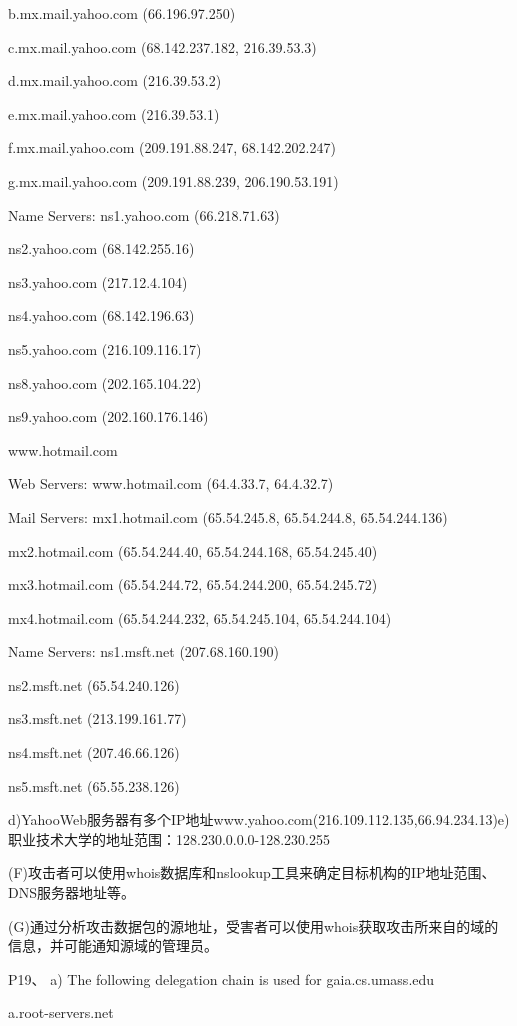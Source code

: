 \documentclass[11pt,UTF8,twoside]{article}
\begin{document}
	b.mx.mail.yahoo.com (66.196.97.250) 
	
	c.mx.mail.yahoo.com (68.142.237.182, 216.39.53.3) 
	
	d.mx.mail.yahoo.com (216.39.53.2) 
	
	e.mx.mail.yahoo.com (216.39.53.1)
	
	f.mx.mail.yahoo.com (209.191.88.247, 68.142.202.247) 
	
	g.mx.mail.yahoo.com (209.191.88.239, 206.190.53.191) 
	
	Name Servers: ns1.yahoo.com (66.218.71.63) 
	
	ns2.yahoo.com (68.142.255.16) 
	
	ns3.yahoo.com (217.12.4.104) 
	
	ns4.yahoo.com (68.142.196.63) 
	
	ns5.yahoo.com (216.109.116.17) 
	
	ns8.yahoo.com (202.165.104.22) 
	
	ns9.yahoo.com (202.160.176.146) 
	
	www.hotmail.com 
	
	Web Servers: www.hotmail.com (64.4.33.7, 64.4.32.7) 
	
	Mail Servers: mx1.hotmail.com (65.54.245.8, 65.54.244.8, 65.54.244.136) 
	
	mx2.hotmail.com (65.54.244.40, 65.54.244.168, 65.54.245.40) 
	
	mx3.hotmail.com (65.54.244.72, 65.54.244.200, 65.54.245.72) 
	
	mx4.hotmail.com (65.54.244.232, 65.54.245.104, 65.54.244.104) 
	
	Name Servers: ns1.msft.net (207.68.160.190) 
	
	ns2.msft.net (65.54.240.126) 
	
	ns3.msft.net (213.199.161.77) 
	
	ns4.msft.net (207.46.66.126) 
	
	ns5.msft.net (65.55.238.126) 
	
	d)YahooWeb服务器有多个IP地址www.yahoo.com(216.109.112.135,66.94.234.13)e)职业技术大学的地址范围：128.230.0.0.0-128.230.255
	
	(F)攻击者可以使用whois数据库和nslookup工具来确定目标机构的IP地址范围、DNS服务器地址等。
	
	(G)通过分析攻击数据包的源地址，受害者可以使用whois获取攻击所来自的域的信息，并可能通知源域的管理员。
	
	P19、
	a) The following delegation chain is used for gaia.cs.umass.edu 
	
	a.root-servers.net 
	
\end{document}
